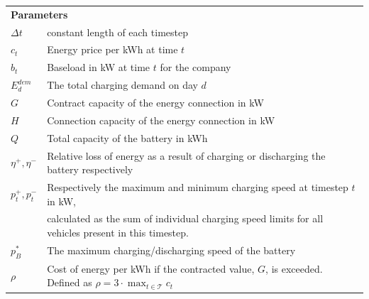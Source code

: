 \documentclass{article}
\begin{document}
\begin{table}[h!]
{\begin{tabular}{ll}
                  \multicolumn{2}{l}{\textbf{Parameters}}                                                                                                                             \\
                  $\Delta t$            & constant length of each timestep                                                                                                            \\
                  $c_{t}$               & Energy price per kWh at time $t$                                                                                                            \\
                  $b_{t}$               & Baseload in kW at time $t$ for the company                                                                                                  \\
                  $E^{dem}_{d}$         & The total charging demand on day $d$                                                                                                        \\
                  $G$                   & Contract capacity of the energy connection in kW                                                                                            \\
                  $H$                   & Connection capacity of the energy connection in kW                                                                                          \\
                  $Q$                   & Total capacity of the battery in kWh                                                                                                        \\
                  $\eta^{+},\eta^{-}$   & Relative loss of energy as a result of charging or discharging the battery respectively                                                     \\
                  $p^+_t, p^-_t$        & Respectively the maximum and minimum charging speed at timestep $t$ in kW,                                                                  \\
                                        & calculated as the sum of individual charging speed limits for all vehicles present in this timestep.                                        \\ [2pt]
                  $p^*_B$               & The maximum charging/discharging speed of the battery                                                                                       \\
                  $\rho$                & Cost of energy per kWh if the contracted value, $G$, is exceeded. Defined as $\displaystyle \rho = 3 \cdot \max_{{t \in \mathcal{T}}}  c_t$ \\[4pt]


\end{tabular}}
\end{table}
\end{document}
